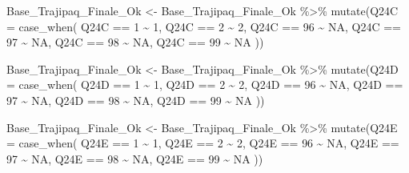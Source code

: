 \documentclass[
]{article}
\newenvironment{Shaded}{\begin{snugshade}}{\end{snugshade}}
\newcommand{\AttributeTok}[1]{\textcolor[rgb]{0.77,0.63,0.00}{#1}}
\newcommand{\ConstantTok}[1]{\textcolor[rgb]{0.00,0.00,0.00}{#1}}
\newcommand{\DecValTok}[1]{\textcolor[rgb]{0.00,0.00,0.81}{#1}}
\newcommand{\FunctionTok}[1]{\textcolor[rgb]{0.00,0.00,0.00}{#1}}
\newcommand{\NormalTok}[1]{#1}
\newcommand{\OtherTok}[1]{\textcolor[rgb]{0.56,0.35,0.01}{#1}}
\newcommand{\SpecialCharTok}[1]{\textcolor[rgb]{0.00,0.00,0.00}{#1}}
\begin{document}
\begin{Shaded}
\begin{Highlighting}[]
\NormalTok{Base\_Trajipaq\_Finale\_Ok }\OtherTok{\textless{}{-}}
\NormalTok{  Base\_Trajipaq\_Finale\_Ok }\SpecialCharTok{\%\textgreater{}\%}
  \FunctionTok{mutate}\NormalTok{(}\AttributeTok{Q24C =} \FunctionTok{case\_when}\NormalTok{(}
\NormalTok{    Q24C }\SpecialCharTok{==} \DecValTok{1} \SpecialCharTok{\textasciitilde{}} \DecValTok{1}\NormalTok{,}
\NormalTok{    Q24C }\SpecialCharTok{==} \DecValTok{2} \SpecialCharTok{\textasciitilde{}} \DecValTok{2}\NormalTok{,}
\NormalTok{    Q24C }\SpecialCharTok{==} \DecValTok{96} \SpecialCharTok{\textasciitilde{}} \ConstantTok{NA}\NormalTok{,}
\NormalTok{    Q24C }\SpecialCharTok{==} \DecValTok{97} \SpecialCharTok{\textasciitilde{}} \ConstantTok{NA}\NormalTok{,}
\NormalTok{    Q24C }\SpecialCharTok{==} \DecValTok{98} \SpecialCharTok{\textasciitilde{}} \ConstantTok{NA}\NormalTok{,}
\NormalTok{    Q24C }\SpecialCharTok{==} \DecValTok{99} \SpecialCharTok{\textasciitilde{}} \ConstantTok{NA}
\NormalTok{  ))}

\NormalTok{Base\_Trajipaq\_Finale\_Ok }\OtherTok{\textless{}{-}}
\NormalTok{  Base\_Trajipaq\_Finale\_Ok }\SpecialCharTok{\%\textgreater{}\%}
  \FunctionTok{mutate}\NormalTok{(}\AttributeTok{Q24D =} \FunctionTok{case\_when}\NormalTok{(}
\NormalTok{    Q24D }\SpecialCharTok{==} \DecValTok{1} \SpecialCharTok{\textasciitilde{}} \DecValTok{1}\NormalTok{,}
\NormalTok{    Q24D }\SpecialCharTok{==} \DecValTok{2} \SpecialCharTok{\textasciitilde{}} \DecValTok{2}\NormalTok{,}
\NormalTok{    Q24D }\SpecialCharTok{==} \DecValTok{96} \SpecialCharTok{\textasciitilde{}} \ConstantTok{NA}\NormalTok{,}
\NormalTok{    Q24D }\SpecialCharTok{==} \DecValTok{97} \SpecialCharTok{\textasciitilde{}} \ConstantTok{NA}\NormalTok{,}
\NormalTok{    Q24D }\SpecialCharTok{==} \DecValTok{98} \SpecialCharTok{\textasciitilde{}} \ConstantTok{NA}\NormalTok{,}
\NormalTok{    Q24D }\SpecialCharTok{==} \DecValTok{99} \SpecialCharTok{\textasciitilde{}} \ConstantTok{NA}
\NormalTok{  ))}

\NormalTok{Base\_Trajipaq\_Finale\_Ok }\OtherTok{\textless{}{-}}
\NormalTok{  Base\_Trajipaq\_Finale\_Ok }\SpecialCharTok{\%\textgreater{}\%}
  \FunctionTok{mutate}\NormalTok{(}\AttributeTok{Q24E =} \FunctionTok{case\_when}\NormalTok{(}
\NormalTok{    Q24E }\SpecialCharTok{==} \DecValTok{1} \SpecialCharTok{\textasciitilde{}} \DecValTok{1}\NormalTok{,}
\NormalTok{    Q24E }\SpecialCharTok{==} \DecValTok{2} \SpecialCharTok{\textasciitilde{}} \DecValTok{2}\NormalTok{,}
\NormalTok{    Q24E }\SpecialCharTok{==} \DecValTok{96} \SpecialCharTok{\textasciitilde{}} \ConstantTok{NA}\NormalTok{,}
\NormalTok{    Q24E }\SpecialCharTok{==} \DecValTok{97} \SpecialCharTok{\textasciitilde{}} \ConstantTok{NA}\NormalTok{,}
\NormalTok{    Q24E }\SpecialCharTok{==} \DecValTok{98} \SpecialCharTok{\textasciitilde{}} \ConstantTok{NA}\NormalTok{,}
\NormalTok{    Q24E }\SpecialCharTok{==} \DecValTok{99} \SpecialCharTok{\textasciitilde{}} \ConstantTok{NA}
\NormalTok{  ))}
\end{Highlighting}
\end{Shaded}
\end{document}

